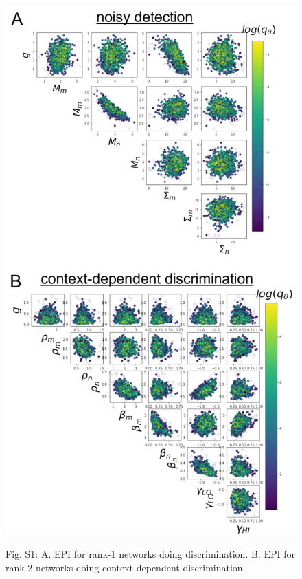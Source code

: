 \documentclass[11pt]{article}
\begin{document}
\begin{figure}
\begin{center}
\includegraphics[scale=0.5]{figs/figS4/figS4.pdf}
\end{center}
Fig. S1: A. EPI for rank-1 networks doing discrimination. B. EPI for rank-2 networks doing context-dependent discrimination.
\end{figure}
\end{document}
